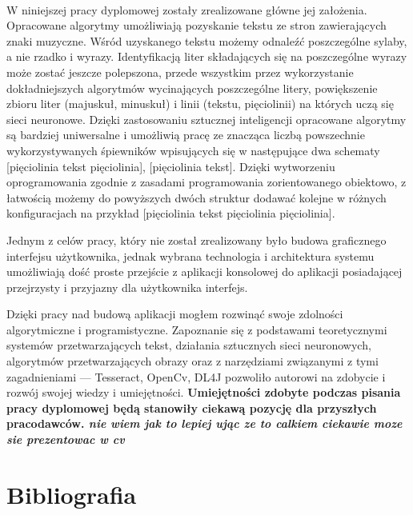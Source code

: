 \documentclass[a4paper,12pt]{article}
\begin{document}
	   \paragraph{\indent} W niniejszej pracy dyplomowej zostały zrealizowane główne jej założenia. Opracowane algorytmy umożliwiają pozyskanie tekstu ze stron zawierających znaki muzyczne. Wśród uzyskanego tekstu możemy odnaleźć poszczególne sylaby, a nie rzadko i wyrazy. Identyfikacją liter składających się na poszczególne wyrazy może zostać jeszcze polepszona, przede wszystkim przez wykorzystanie dokładniejszych algorytmów wycinających poszczególne litery, powiększenie zbioru liter (majuskuł, minuskuł) i linii (tekstu, pięciolinii) na których uczą się sieci neuronowe. Dzięki zastosowaniu sztucznej inteligencji opracowane algorytmy są bardziej uniwersalne i umożliwią pracę ze znacząca liczbą powszechnie wykorzystywanych śpiewników wpisujących się w następujące dwa schematy [pięciolinia tekst pięciolinia], [pięciolinia tekst]. Dzięki wytworzeniu oprogramowania zgodnie z zasadami programowania zorientowanego obiektowo, z łatwością możemy do powyższych dwóch struktur dodawać kolejne w różnych konfiguracjach na przykład [pięciolinia tekst pięciolinia pięciolinia]. 
	   \par Jednym z celów pracy, który nie został zrealizowany było budowa graficznego interfejsu użytkownika, jednak wybrana technologia i architektura systemu umożliwiają dość proste przejście z aplikacji konsolowej do aplikacji posiadającej przejrzysty i przyjazny dla użytkownika interfejs. 
	   \par Dzięki pracy nad budową aplikacji mogłem rozwinąć swoje zdolności algorytmiczne i programistyczne. Zapoznanie się z podstawami teoretycznymi systemów przetwarzających tekst, działania sztucznych sieci neuronowych, algorytmów przetwarzających obrazy oraz z narzędziami związanymi z tymi zagadnieniami --- Tesseract, OpenCv, DL4J pozwoliło autorowi na zdobycie i rozwój swojej wiedzy i umiejętności. \textbf{Umiejętności zdobyte podczas pisania pracy dyplomowej będą stanowiły ciekawą pozycję dla przyszłych pracodawców. \textit{nie wiem jak to lepiej ując ze to calkiem ciekawie moze sie prezentowac w cv}}
	   
	   \newpage
	   \section{Bibliografia}
\end{document}
